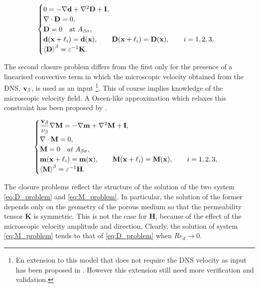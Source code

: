 \begin{eqnarray*}
\begin{cases}
0 = -\nabla \mathbf{d} + \nabla^2 \mathbf{D} +\mathbf{I},\\
\nabla \cdot \mathbf{D} = 0,  \\
\mathbf{D} = 0 \quad \textrm{at} \; A_{\beta \sigma}, \\
\mathbf{d}(\mathbf{x} +\ell_i) = \mathbf{d}(\mathbf{x}), \qquad \mathbf{D}(\mathbf{x} +\ell_i) = \mathbf{D}(\mathbf{x}), \qquad i=1,2,3 , \\
{\left< \mathbf{D} \right>}^{\beta} = \varepsilon^{-1} \mathbf{K}.
\end{cases}
\end{eqnarray*}

The second closure problem differs from the first only for the presence of a linearised convective term 
in which the microscopic velocity obtained from the DNS, $\textbf{v}_{\beta}$, is used as an input \footnote{En extension to this model that does not require the DNS velocity as input has been proposed in \citet{valdes2016new}. However this extension still need more verification and validation.}.  This of course implies knowledge of the microscopic velocity field. A Oseen-like approximation which relaxes this constraint has been proposed by \citet{zampogna2016fluid}.

\begin{eqnarray*}
\begin{cases}
\dfrac{\textbf{v}_{\beta}}{\nu_{\beta}} \nabla \mathbf{M} = -\nabla \mathbf{m} + \nabla^2 \mathbf{M} +\mathbf{I},\\
\nabla \cdot \mathbf{M} = 0,  \\
\mathbf{M} = 0 \quad at \; A_{\beta \sigma}, \\
\mathbf{m}(\mathbf{x} +\ell_i) = \mathbf{m}(\mathbf{x}), \qquad \mathbf{M}(\mathbf{x} +\ell_i) = \mathbf{M}(\mathbf{x}), \qquad i=1,2,3 ,\\
{\left< \mathbf{M} \right>}^{\beta} = \varepsilon^{-1} \mathbf{H}.
\end{cases}
\label{eq:h_model}
\end{eqnarray*}


The closure problems reflect the structure of the solution of the two system \eqref{eq:D_problem} and \eqref{eq:M_problem}. In particular, the solution of the former depends only on the geometry of the porous medium so that the permeability tensor $\mathbf{K}$ is symmetric. This is not the case for $\mathbf{H}$, because of the effect of the microscopic velocity amplitude and direction.  Clearly, the solution of system \eqref{eq:M_problem} tends to that of \eqref{eq:D_problem} when $Re_d \rightarrow 0$. 


